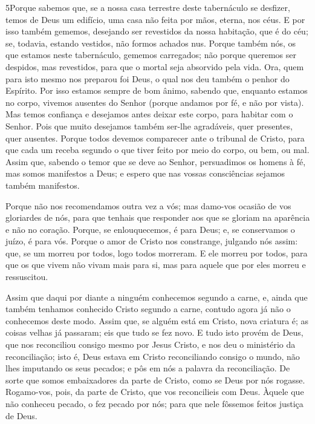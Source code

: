 \lettrine{5} Porque sabemos que, se a nossa casa terrestre
deste tabernáculo se desfizer, temos de Deus um edifício, uma casa
não feita por mãos, eterna, nos céus. E por isso também gememos,
desejando ser revestidos da nossa habitação, que é do céu; se,
todavia, estando vestidos, não formos achados nus. Porque também
nós, os que estamos neste tabernáculo, gememos carregados; não
porque queremos ser despidos, mas revestidos, para que o mortal seja
absorvido pela vida. Ora, quem para isto mesmo nos preparou foi
Deus, o qual nos deu também o penhor do Espírito. Por isso
estamos sempre de bom ânimo, sabendo que, enquanto estamos no corpo,
vivemos ausentes do Senhor (porque andamos por fé, e não por
vista). Mas temos confiança e desejamos antes deixar este corpo,
para habitar com o Senhor. Pois que muito desejamos também
ser-lhe agradáveis, quer presentes, quer ausentes. Porque
todos devemos comparecer ante o tribunal de Cristo, para que cada um
receba segundo o que tiver feito por meio do corpo, ou bem, ou mal.
Assim que, sabendo o temor que se deve ao Senhor, persuadimos
os homens à fé, mas somos manifestos a Deus; e espero que nas vossas
consciências sejamos também manifestos.

Porque não nos recomendamos outra vez a vós; mas damo-vos ocasião
de vos gloriardes de nós, para que tenhais que responder aos que se
gloriam na aparência e não no coração. Porque, se
enlouquecemos, é para Deus; e, se conservamos o juízo, é para vós.
Porque o amor de Cristo nos constrange, julgando nós assim:
que, se um morreu por todos, logo todos morreram. E ele
morreu por todos, para que os que vivem não vivam mais para si, mas
para aquele que por eles morreu e ressuscitou.

Assim que daqui por diante a ninguém conhecemos segundo a carne,
e, ainda que também tenhamos conhecido Cristo segundo a carne,
contudo agora já não o conhecemos deste modo. Assim que, se
alguém está em Cristo, nova criatura é; as coisas velhas já
passaram; eis que tudo se fez novo. E tudo isto provém de
Deus, que nos reconciliou consigo mesmo por Jesus Cristo, e nos deu
o ministério da reconciliação; isto é, Deus estava em Cristo
reconciliando consigo o mundo, não lhes imputando os seus pecados; e
pôs em nós a palavra da reconciliação. De sorte que somos
embaixadores da parte de Cristo, como se Deus por nós rogasse.
Rogamo-vos, pois, da parte de Cristo, que vos reconcilieis com Deus.
Àquele que não conheceu pecado, o fez pecado por nós; para
que nele fôssemos feitos justiça de Deus.

\medskip

